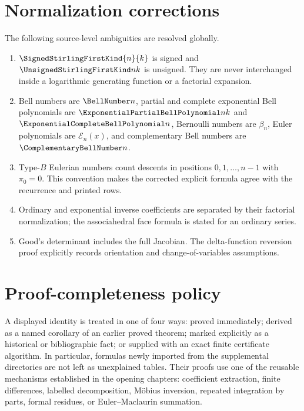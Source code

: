 \documentclass[11pt,a4paper,oneside,openany]{book}
\theoremstyle{definition}
\theoremstyle{remark}
\begin{document}
\section{Normalization corrections}

The following source-level ambiguities are resolved globally.
\begin{enumerate}
\item $\SignedStirlingFirstKind{n}{k}$ is signed and $\UnsignedStirlingFirstKind nk$ is unsigned.  They are never
      interchanged inside a logarithmic generating function or a factorial
      expansion.
\item Bell numbers are $\BellNumber n$, partial and complete exponential Bell
      polynomials are $\ExponentialPartialBellPolynomial nk$ and $\ExponentialCompleteBellPolynomial n$, Bernoulli numbers are
      $\beta_n$, Euler polynomials are $\mathcal E_n(x)$, and complementary
      Bell numbers are $\ComplementaryBellNumber n$.
\item Type-$B$ Eulerian numbers count descents in positions
      $0,1,\ldots,n-1$ with $\pi_0=0$.  This convention makes the corrected
      explicit formula agree with the recurrence and printed rows.
\item Ordinary and exponential inverse coefficients are separated by their
      factorial normalization; the associahedral face formula is stated for
      an ordinary series.
\item Good's determinant includes the full Jacobian.  The delta-function
      reversion proof explicitly records orientation and change-of-variables
      assumptions.
\end{enumerate}

\section{Proof-completeness policy}

A displayed identity is treated in one of four ways: proved immediately;
derived as a named corollary of an earlier proved theorem; marked explicitly as
a historical or bibliographic fact; or supplied with an exact finite
certificate algorithm.  In particular, formulas newly imported from the
supplemental directories are not left as unexplained tables.  Their proofs use
one of the reusable mechanisms established in the opening chapters:
coefficient extraction, finite differences, labelled decomposition, Möbius
inversion, repeated integration by parts, formal residues, or
Euler--Maclaurin summation.
\end{document}
